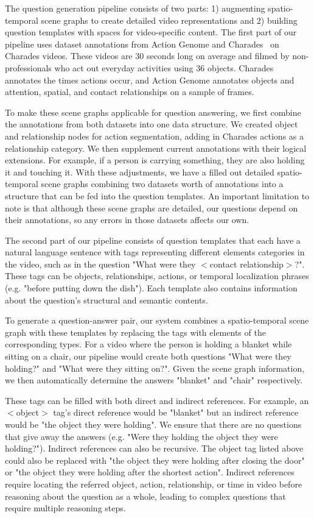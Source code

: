 \documentclass[10pt,twocolumn,letterpaper]{article}
\begin{document}
The question generation pipeline consists of two parts: 1) augmenting spatio-temporal scene graphs to create detailed video representations and 2) building question templates with spaces for video-specific content. The first part of our pipeline uses dataset annotations from Action Genome and Charades~\cite{ji2020action,sigurdsson2016hollywood} on Charades videos. These videos are 30 seconds long on average and filmed by non-professionals who act out everyday activities using 36 objects. Charades annotates the times actions occur, and Action Genome annotates objects and attention, spatial, and contact relationships on a sample of frames. 

To make these scene graphs applicable for question answering, we first combine the annotations from both datasets into one data structure. We created object and relationship nodes for action segmentation, adding in Charades actions as a relationship category. We then supplement current annotations with their logical extensions. For example, if a person is carrying something, they are also holding it and touching it. With these adjustments, we have a filled out detailed spatio-temporal scene graphs combining two datasets worth of annotations into a structure that can be fed into the question templates. An important limitation to note is that although these scene graphs are detailed, our questions depend on their annotations, so any errors in those datasets affects our own.
    
The second part of our pipeline consists of question templates that each have a natural language sentence with tags representing different elements categories in the video, such as in the question "What were they $<$contact relationship$>$?". These tags can be objects, relationships, actions, or temporal localization phrases (e.g. "before putting down the dish"). Each template also contains information about the question's structural and semantic contents. 

To generate a question-answer pair, our system combines a spatio-temporal scene graph with these templates by replacing the tags with elements of the corresponding types. For a video where the person is holding a blanket while sitting on a chair, our pipeline would create both questions "What were they holding?" and "What were they sitting on?". Given the scene graph information, we then automatically determine the answers "blanket" and "chair" respectively. 

These tags can be filled with both direct and indirect references. For example, an $<$object$>$ tag's direct reference would be "blanket" but an indirect reference would be "the object they were holding". We ensure that there are no questions that give away the answers (e.g. "Were they holding the object they were holding?"). Indirect references can also be recursive. The object tag listed above could also be replaced with "the object they were holding after closing the door" or "the object they were holding after the shortest action". Indirect references require locating the referred object, action, relationship, or time in video before reasoning about the question as a whole, leading to complex questions that require multiple reasoning steps. 
    
\end{document}
